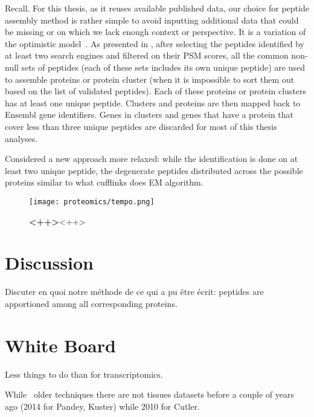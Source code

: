 Recall.
For this thesis, as it reuses available published data,
our choice for peptide assembly method is rather simple
to avoid inputting additional data that could be missing or
on which we lack enough context or perspective.
It is a variation of the optimistic model~.
As presented in ,
after selecting the peptides identified by at least two search engines
and filtered on their \gls{PSM} scores,
all the common non-null sets of peptides
(each of these sets includes its own unique peptide)
are used to assemble proteins or protein cluster
(when it is impossible to sort them out based on the list of validated peptides).
Each of these proteins or protein clusters has at least one unique peptide.
Clusters and proteins are then mapped back to \gls{Ensembl} gene identifiers.
Genes in clusters and
genes that have a protein that cover less than three unique peptides
are discarded for most of this thesis analyses.


Considered a new approach more relaxed:
while the identification is done on at least two unique peptide,
the degenerate peptides distributed across the possible proteins
similar to what cufflinks does EM algorithm.

\begin{figure}[!]
    \texttt{[image: proteomics/tempo.png]}\centering
    \caption[New quantification method]{\label{fig:newQuantProtMeth}\textbf{<++>}<++>}
\end{figure}

\section{Discussion}

Discuter en quoi notre méthode de ce qui a pu être écrit:
 peptides are apportioned among all corresponding proteins.




\section{White Board}

Less things to do than for transcriptomics.

While \ms\ older techniques there are not tissues datasets before a couple of
years ago (2014 for Pandey, Kuster) while 2010 for Cutler.


